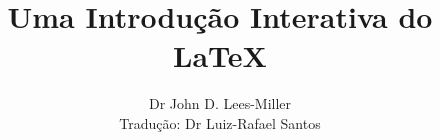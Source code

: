 \newenvironment{exampletwouptiny}
  {\VerbatimEnvironment
   \begin{VerbatimOut}{example.out}}
  {\end{VerbatimOut}
   \setlength{\parindent}{0pt}
   \fbox{\begin{tabular}{l|l}
   \begin{minipage}{0.55\linewidth}
     \inputminted[fontsize=\scriptsize,resetmargins]{latex}{example.out}
   \end{minipage} &
   \begin{minipage}{0.35\linewidth}
     \setlength{\parskip}{6pt plus 1pt minus 1pt}%
     \raggedright\scriptsize
   \end{minipage}
   \end{tabular}}}

\newenvironment{exampletwouptinynoframe}
  {\VerbatimEnvironment
   \begin{VerbatimOut}{example.out}}
  {\end{VerbatimOut}
   \setlength{\parindent}{0pt}
   \begin{tabular}{l|l}
   \begin{minipage}{0.55\linewidth}
     \inputminted[fontsize=\scriptsize,resetmargins]{latex}{example.out}
   \end{minipage} &
   \begin{minipage}{0.35\linewidth}
     \setlength{\parskip}{6pt plus 1pt minus 1pt}%
     \raggedright\scriptsize
   \end{minipage}
   \end{tabular}}

\title{Uma Introdução Interativa do  \LaTeX}
\author{Dr John D. Lees-Miller \texorpdfstring{\\[2mm]}{}
Tradução: Dr Luiz-Rafael Santos
}


